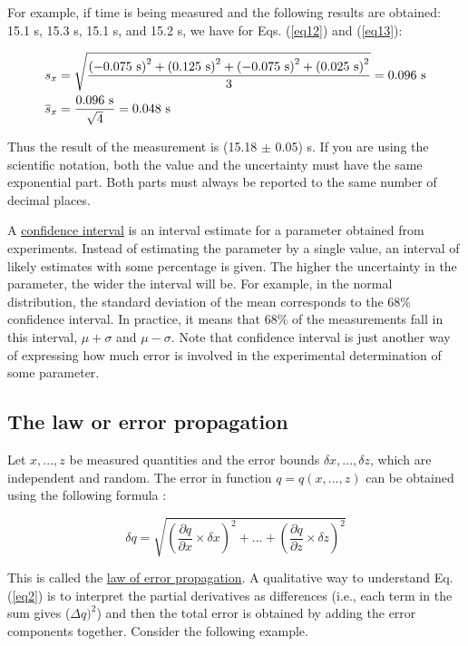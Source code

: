 \documentclass[byrevtex,amssymb,aps,pra,floatfix,letterpaper]{revtex4}
\begin{document}
\noindent
For example, if time is being measured and the following results are obtained: 15.1 s, 15.3 s, 15.1
s, and 15.2 s, we have for Eqs. (\ref{eq12}) and (\ref{eq13}):

\begin{eqnarray}
\label{eq14}
& s_x = \sqrt{\frac{\left(-0.075\textnormal{ s}\right)^2 + \left(0.125\textnormal{ s}\right)^2 + \left(-0.075\textnormal{ s}\right)^2 + \left(0.025\textnormal{ s}\right)^2}{3}} = 0.096\textnormal{ s}\\
\nonumber
& \overline{s}_x = \frac{0.096\textnormal{ s}}{\sqrt{4}} = 0.048\textnormal{ s}
\end{eqnarray}

\noindent
Thus the result of the measurement is (15.18 $\pm$ 0.05) s. If you are using the scientific notation, both the value and the uncertainty must have the same exponential part. Both parts must always be reported to the same number of decimal places.

A \href{http://en.wikipedia.org/wiki/Confidence_interval}{\underline{confidence interval}} is an interval estimate for a parameter obtained from experiments. Instead of estimating the parameter by a single value, an interval of likely estimates with some percentage is given. The higher the uncertainty in the parameter, the wider the interval will be. For example, in the normal distribution, the standard deviation of the mean corresponds to the 68\% confidence interval. In practice, it means that 68\% of the measurements fall in this interval, $\mu + \sigma$ and $\mu - \sigma$. Note that confidence interval is just another way of expressing how much error is involved in the experimental determination of some parameter.

\subsection{The law or error propagation}

Let $x, ..., z$ be measured quantities and the error bounds $\delta x, ..., \delta z$, which are independent and
random. The error in function $q = q(x, ..., z)$ can be obtained using the following formula
\cite{TAYLOR}:

\begin{equation}
\label{eq2}
\delta q = \sqrt{\left(\frac{\partial q}{\partial x}\times\delta x\right)^2 + ... + \left(\frac{\partial q}{\partial z}\times\delta z\right)^2}
\end{equation}

\noindent
This is called the \href{http://en.wikipedia.org/wiki/Error_propagation}{law of error propagation}. A qualitative way to understand Eq. (\ref{eq2}) is to interpret the partial derivatives as differences (i.e., each term in the sum gives ($\Delta q)^2$) and then the total error is obtained by adding the error components together. Consider the following example.\\
\end{document}
